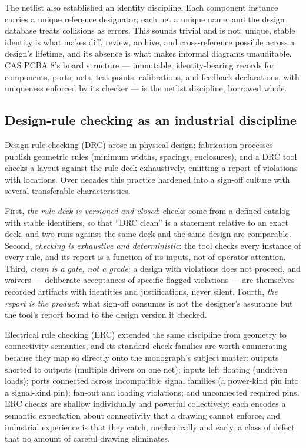 The netlist also established an identity discipline. Each component
instance carries a unique reference designator; each net a unique name;
and the design database treats collisions as errors. This sounds trivial
and is not: unique, stable identity is what makes diff, review, archive,
and cross-reference possible across a design's lifetime, and its absence
is what makes informal diagrams unauditable. CAS PCBA 8's board structure
--- immutable, identity-bearing records for components, ports, nets, test
points, calibrations, and feedback declarations, with uniqueness enforced
by its checker --- is the netlist discipline, borrowed whole.

\subsection{Design-rule checking as an industrial discipline}\label{ch02:eda:drc}

Design-rule checking (DRC) arose in physical design: fabrication processes
publish geometric rules (minimum widths, spacings, enclosures), and a DRC
tool checks a layout against the rule deck exhaustively, emitting a
report of violations with locations. Over decades this practice hardened
into a sign-off culture with several transferable characteristics.

First, \emph{the rule deck is versioned and closed}: checks come from a
defined catalog with stable identifiers, so that ``DRC clean'' is a
statement relative to an exact deck, and two runs against the same deck
and the same design are comparable. Second, \emph{checking is exhaustive
and deterministic}: the tool checks every instance of every rule, and its
report is a function of its inputs, not of operator attention. Third,
\emph{clean is a gate, not a grade}: a design with violations does not
proceed, and waivers --- deliberate acceptances of specific flagged
violations --- are themselves recorded artifacts with identities and
justifications, never silent. Fourth, \emph{the report is the product}:
what sign-off consumes is not the designer's assurance but the tool's
report bound to the design version it checked.

Electrical rule checking (ERC) extended the same discipline from geometry
to connectivity semantics, and its standard check families are worth
enumerating because they map so directly onto the monograph's subject
matter: outputs shorted to outputs (multiple drivers on one net); inputs
left floating (undriven loads); ports connected across incompatible
signal families (a power-kind pin into a signal-kind pin); fan-out and
loading violations; and unconnected required pins. ERC checks are shallow
individually and powerful collectively: each encodes a semantic
expectation about connectivity that a drawing cannot enforce, and
industrial experience is that they catch, mechanically and early, a class
of defect that no amount of careful drawing eliminates.

